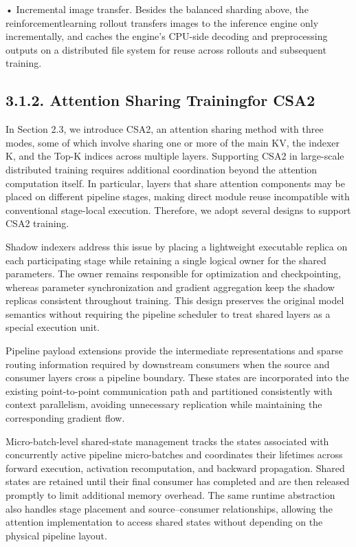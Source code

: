 \documentclass[
  10
]{article}
\begin{document}
• Incremental image transfer. Besides the balanced sharding above, the
reinforcementlearning rollout transfers images to the inference engine
only incrementally, and caches the engine's CPU-side decoding and
preprocessing outputs on a distributed file system for reuse across
rollouts and subsequent training.

\subsection{3.1.2. Attention Sharing Trainingfor
CSA2}\label{attention-sharing-trainingfor-csa2}

In Section 2.3, we introduce CSA2, an attention sharing method with
three modes, some of which involve sharing one or more of the main KV,
the indexer K, and the Top-K indices across multiple layers. Supporting
CSA2 in large-scale distributed training requires additional
coordination beyond the attention computation itself. In particular,
layers that share attention components may be placed on different
pipeline stages, making direct module reuse incompatible with
conventional stage-local execution. Therefore, we adopt several designs
to support CSA2 training.

Shadow indexers address this issue by placing a lightweight executable
replica on each participating stage while retaining a single logical
owner for the shared parameters. The owner remains responsible for
optimization and checkpointing, whereas parameter synchronization and
gradient aggregation keep the shadow replicas consistent throughout
training. This design preserves the original model semantics without
requiring the pipeline scheduler to treat shared layers as a special
execution unit.

Pipeline payload extensions provide the intermediate representations and
sparse routing information required by downstream consumers when the
source and consumer layers cross a pipeline boundary. These states are
incorporated into the existing point-to-point communication path and
partitioned consistently with context parallelism, avoiding unnecessary
replication while maintaining the corresponding gradient flow.

Micro-batch-level shared-state management tracks the states associated
with concurrently active pipeline micro-batches and coordinates their
lifetimes across forward execution, activation recomputation, and
backward propagation. Shared states are retained until their final
consumer has completed and are then released promptly to limit
additional memory overhead. The same runtime abstraction also handles
stage placement and source--consumer relationships, allowing the
attention implementation to access shared states without depending on
the physical pipeline layout.
\end{document}
